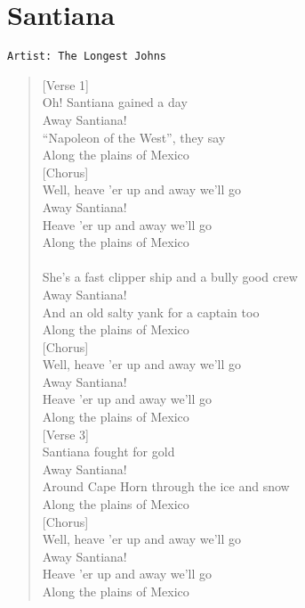 \documentclass[11pt]{article}
\begin{document}
\section{Santiana}
\label{sec:org2120780}
\begin{verbatim}
Artist: The Longest Johns
\end{verbatim}
\begin{verse}
[Verse 1]\\
Oh! Santiana gained a day\\
Away Santiana!\\
``Napoleon of the West'', they say\\
Along the plains of Mexico\\
\vspace*{1em}
[Chorus]\\
Well, heave 'er up and away we'll go\\
Away Santiana!\\
Heave 'er up and away we'll go\\
Along the plains of Mexico\\
[Verse 2]\\
She's a fast clipper ship and a bully good crew\\
Away Santiana!\\
And an old salty yank for a captain too\\
Along the plains of Mexico\\
\vspace*{1em}
[Chorus]\\
Well, heave 'er up and away we'll go\\
Away Santiana!\\
Heave 'er up and away we'll go\\
Along the plains of Mexico\\
\vspace*{1em}
[Verse 3]\\
Santiana fought for gold\\
Away Santiana!\\
Around Cape Horn through the ice and snow\\
Along the plains of Mexico\\
\vspace*{1em}
[Chorus]\\
Well, heave 'er up and away we'll go\\
Away Santiana!\\
Heave 'er up and away we'll go\\
Along the plains of Mexico\\
\vspace*{1em}

\end{verse}
\end{document}
